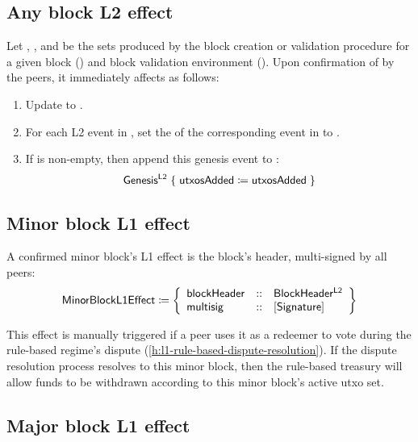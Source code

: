 \documentclass[../hydrozoa.tex]{subfiles}
\begin{document}
\subsection{Any block L2 effect}%
\label{h:l2-block-effect-l2}%

Let , , and  be the sets produced by the block creation or validation procedure for a given block () and block validation environment ().
Upon confirmation of  by the peers, it immediately affects  as follows:
\begin{enumerate}
  \item Update  to .
  \item For each L2 event in , set the  of the corresponding event in  to .
  \item If  is non-empty, then append this genesis event to :
    \begin{equation*}
      \mathsf{Genesis^{L2}} \;\{\; \mathsf{utxosAdded} \coloneq \mathsf{utxosAdded} \;\}
    \end{equation*}
\end{enumerate}

\subsection{Minor block L1 effect}%
\label{h:l2-block-effect-minor-block}%

A confirmed minor block's L1 effect is the block's header, multi-signed by all peers:
\begin{equation*}
  \mathsf{MinorBlockL1Effect} \coloneq \left\{
    \begin{array}{lll}
      \mathsf{blockHeader} &::& \mathsf{BlockHeader^{L2}} \\
      \mathsf{multisig} &::& [\mathsf{Signature}]
    \end{array}\right\}
\end{equation*}

This effect is manually triggered if a peer uses it as a redeemer to vote during the rule-based regime's dispute (\cref{h:l1-rule-based-dispute-resolution}).
If the dispute resolution process resolves to this minor block, then the rule-based treasury will allow funds to be withdrawn according to this minor block's active utxo set.

\subsection{Major block L1 effect}%
\label{h:l2-block-effect-major-block}%
\end{document}
